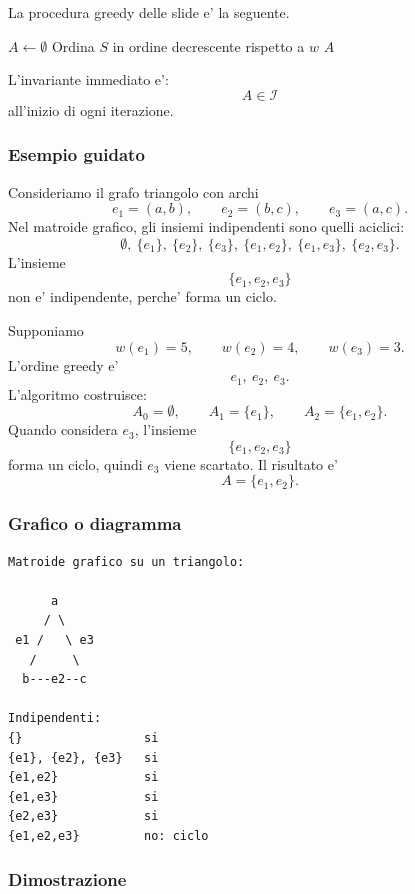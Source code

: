 La procedura greedy delle slide e' la seguente.

\begin{algorithm}[H]
	\caption{\textsc{Greedy}$(M,w)$}
	$A\gets\emptyset$
	Ordina $S$ in ordine decrescente rispetto a $w$\;
	\Return $A$\;
\end{algorithm}

L'invariante immediato e':
\[
A\in\mathcal{I}
\]
all'inizio di ogni iterazione.

\subsubsection{Esempio guidato}
Consideriamo il grafo triangolo con archi
\[
e_1=(a,b),\qquad e_2=(b,c),\qquad e_3=(a,c).
\]
Nel matroide grafico, gli insiemi indipendenti sono quelli aciclici:
\[
\emptyset,\ \{e_1\},\ \{e_2\},\ \{e_3\},\ \{e_1,e_2\},\ \{e_1,e_3\},\ \{e_2,e_3\}.
\]
L'insieme
\[
\{e_1,e_2,e_3\}
\]
non e' indipendente, perche' forma un ciclo.

Supponiamo
\[
w(e_1)=5,\qquad w(e_2)=4,\qquad w(e_3)=3.
\]
L'ordine greedy e'
\[
e_1,\ e_2,\ e_3.
\]
L'algoritmo costruisce:
\[
A_0=\emptyset,
\qquad
A_1=\{e_1\},
\qquad
A_2=\{e_1,e_2\}.
\]
Quando considera $e_3$, l'insieme
\[
\{e_1,e_2,e_3\}
\]
forma un ciclo, quindi $e_3$ viene scartato. Il risultato e'
\[
A=\{e_1,e_2\}.
\]

\subsubsection{Grafico o diagramma}
\begin{center}
\begin{verbatim}
Matroide grafico su un triangolo:

      a
     / \
 e1 /   \ e3
   /     \
  b---e2--c

Indipendenti:
{}                 si
{e1}, {e2}, {e3}   si
{e1,e2}            si
{e1,e3}            si
{e2,e3}            si
{e1,e2,e3}         no: ciclo
\end{verbatim}
\end{center}

\subsubsection{Dimostrazione}

